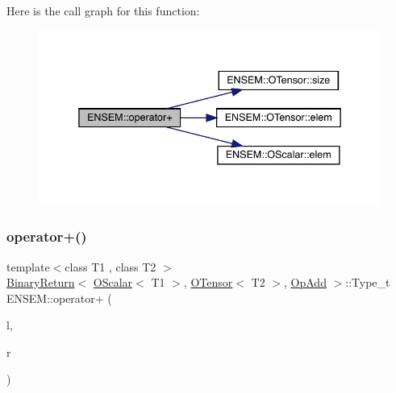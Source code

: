 Here is the call graph for this function\+:\nopagebreak
\begin{figure}[H]
\begin{center}
\leavevmode
\includegraphics[width=338pt]{de/d87/group__obstensor_gad2c9b97ae39bad4adefe3d2f480c0eb6_cgraph}
\end{center}
\end{figure}
\mbox{\label{group__obstensor_ga182db37f6b2f7005ba76d65458ac5424}} 
\subsubsection{\texorpdfstring{operator+()}{operator+()}\hspace{0.1cm}{\footnotesize\ttfamily [4/4]}}
{\footnotesize\ttfamily template$<$class T1 , class T2 $>$ \\
\mbox{\hyperlink{structENSEM_1_1BinaryReturn}{Binary\+Return}}$<$ \mbox{\hyperlink{classENSEM_1_1OScalar}{O\+Scalar}}$<$ T1 $>$, \mbox{\hyperlink{classENSEM_1_1OTensor}{O\+Tensor}}$<$ T2 $>$, \mbox{\hyperlink{structENSEM_1_1OpAdd}{Op\+Add}} $>$\+::Type\+\_\+t E\+N\+S\+E\+M\+::operator+ (\begin{DoxyParamCaption}\item[{const \mbox{\hyperlink{classENSEM_1_1OScalar}{O\+Scalar}}$<$ T1 $>$ \&}]{l,  }\item[{const \mbox{\hyperlink{classENSEM_1_1OTensor}{O\+Tensor}}$<$ T2 $>$ \&}]{r }\end{DoxyParamCaption})\hspace{0.3cm}{\ttfamily [inline]}}


